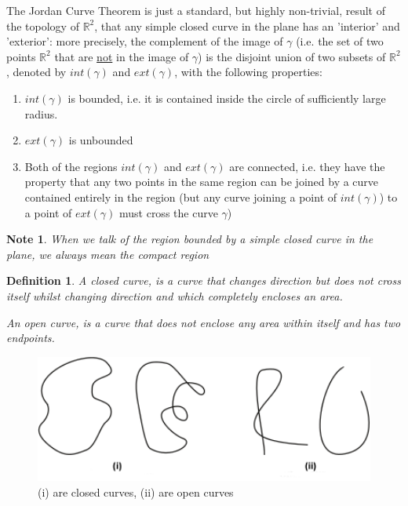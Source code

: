 \documentclass[a4paper]{book}
\newtheorem{note}[theorem]{Note}%
\newtheorem{definition}[theorem]{Definition}%
\numberwithin{theorem}{section}%
\begin{document}
The Jordan Curve Theorem is just a standard, but highly non-trivial, result of the topology of $\mathbb{R}^2$, that any simple closed curve in the plane has an 'interior' and 'exterior': more precisely, the complement of the image of $\gamma$ (i.e. the set of two points $\mathbb{R}^2$ that are \underline{not} in the image of $\gamma$) is the disjoint union of two subsets of $\mathbb{R}^2$, denoted by $int(\gamma)$ and $ext(\gamma)$, with the following properties:
\begin{enumerate}
    \item $int(\gamma)$ is bounded, i.e. it is contained inside the circle of sufficiently large radius.
    \item $ext(\gamma)$ is unbounded
    \item Both of the regions $int(\gamma)$ and $ext(\gamma)$ are connected, i.e. they have the property that any two points in the same region can be joined by a curve contained entirely in the region (but any curve joining a point of $int(\gamma)$) to a point of $ext(\gamma)$ must cross the curve $\gamma$)
\end{enumerate}


\begin{note} 
    When we talk of the region bounded by a simple closed curve in the plane, we always mean the compact region
\end{note}

\begin{definition}
    A closed curve, is a curve that changes direction but does not cross itself whilst changing direction and which completely encloses an \textit{area}. 

    An open curve, is a curve that does not enclose any area within itself and has two endpoints.
\end{definition}
\begin{figure}[hbt!]
    \begin{center}   
        \includegraphics[width=130mm]{ClosedCurve}
        \caption{(i) are closed curves, (ii) are open curves}
    \end{center}
\end{figure}\leavevmode
\end{document}
